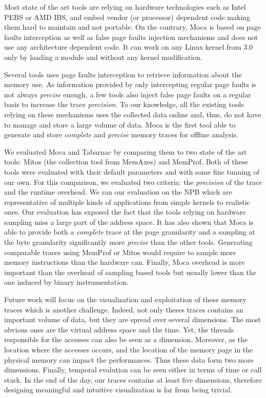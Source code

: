 Most state of the art tools are relying on hardware technologies such as \gls{Intel} \gls{PEBS} or \gls{AMD} \gls{IBS}, and embed vendor (or processor) dependent code making them hard to maintain and not portable.
On the contrary, \gls{Moca} is based on page faults interception as well as false page faults injection mechanisms and does not use any architecture dependent code.
It can work on any \gls{Linux} kernel from $3.0$ only by loading a module and without any kernel modification.

Several tools uses page faults interception to retrieve information about the memory use.
As information provided by only intercepting regular page faults is not always \emph{precise} enough, a few tools also inject false page faults on a regular basis to increase the trace \emph{precision}.
To our knowledge, all the existing tools relying on these mechanisms uses the collected data online and, thus, do not have to manage and store a large volume of data.
\gls{Moca} is the first tool able to generate and store \emph{complete} and \emph{precise} memory traces for offline analysis.

We evaluated \gls{Moca} and \gls{Tabarnac} by comparing them to two state of the art tools: \gls{Mitos} (the collection tool from \gls{MemAxes}) and \gls{MemProf}.
Both of these tools were evaluated with their default parameters and with some fine tunning of our own.
For this comparison, we evaluated two criteria: the \emph{precision} of the trace and the runtime overhead.
We ran our evaluation on the \gls{NPB} which are representative of multiple kinds of applications from simple kernels to realistic ones.
Our evaluation has exposed the fact that the tools relying on hardware sampling miss a large part of the address space.
It has also shown that \gls{Moca} is able to provide both a \emph{complete} trace at the page granularity and a sampling at the byte granularity significantly more \emph{precise} than the other tools.
Generating comparable traces using \gls{MemProf} or \gls{Mitos} would require to sample more memory instructions than the hardware can.
Finally, \gls{Moca} overhead is more important than the overhead of sampling based tools but usually lower than the one induced by binary instrumentation.

Future work will focus on the visualization and exploitation of these memory traces which is another challenge.
Indeed, not only theses traces contains an important volume of data, but they are spread over several dimensions.
The most obvious ones are the virtual address space and the time.
Yet, the threads responsible for the accesses can also be seen as a dimension.
Moreover, as the location where the accesses occurs, and the location of the memory page in the physical memory can impact the performances.
Thus these data form two more dimensions.
Finally, temporal evolution can be seen either in terms of time or call stack.
In the end of the day, our traces contains at least five dimensions, therefore designing meaningful and intuitive visualization is far from being trivial.

